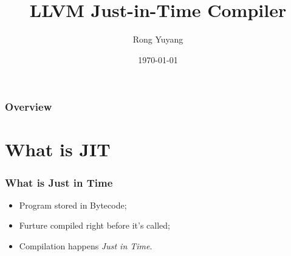 \documentclass{beamer}
\title[LLVM JIT]{LLVM Just-in-Time Compiler} %
\author{Rong Yuyang} %
\institute[SIST] %
{
ShanghaiTech University \\ %
School of Information Science and Technology(SIST) \\
\medskip
\textit{rongyy@shanghaitech.edu.cn} %
}
\date{\today} %
\begin{document}
\begin{frame}
\titlepage %
\end{frame}

\begin{frame}
\frametitle{Overview} %
\tableofcontents %
\end{frame}


\section{What is JIT} %


\begin{frame}
\frametitle{What is Just in Time}
\begin{itemize}
	\item Program stored in Bytecode;
	\item Furture compiled right before it's called;
	\item Compilation happens \textit{Just in Time}.
\end{itemize}
\end{frame}
\end{document}
